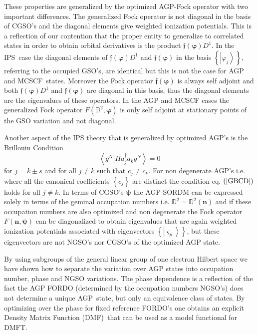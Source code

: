 \documentclass[aps,preprint]{revtex4}%
\begin{document}
These properties are generalized by the optimized AGP-Fock operator with two
important differences. The generalized Fock operator is not diagonal in the
basis of CGSO's and the diagonal elements give weighted ionization potentials.
This is a reflection of our contention that the proper entity to generalize to
correlated states in order to obtain orbital derivatives is the product
$\mathfrak{f}\left(  \mathbf{\varphi}\right)  D^{1}$. In the IPS\ case the
diagonal elements of $\mathfrak{f}\left(  \mathbf{\varphi}\right)  D^{1}$ and
$\mathfrak{f}\left(  \mathbf{\varphi}\right)  $ in the basis $\left\{
\left\vert \varphi_{j}\right\rangle \right\}  $, referring to the occupied
GSO's, are identical but this is not the case for AGP and MCSCF\ states.
Moreover the Fock operator $\mathfrak{f}\left(  \mathbf{\varphi}\right)  $ is
always self adjoint and both $\mathfrak{f}\left(  \mathbf{\varphi}\right)
D^{1}$ and $\mathfrak{f}\left(  \mathbf{\varphi}\right)  $ are diagonal in
this basis, thus the diagonal elements are the eigenvalues of these operators.
In the AGP and MCSCF cases the generalized Fock operator $F\left(
\mathbb{D}^{2},\mathbf{\varphi}\right)  $ is only self adjoint at stationary
points of the GSO variation and not diagonal.

Another aspect of the IPS theory that is generalized by optimized AGP's is the
Brillouin Condition
\begin{equation}
\left\langle \left.  g^{N}\right\vert Ha_{j}^{\dagger}a_{k}g^{N}\right\rangle
=0 \label{GBCD}%
\end{equation}
for $j=k\pm s$ and for all $j\neq k$ such that $c_{j}\neq c_{k}$. For non
degenerate AGP's i.e. where all the canonical coefficients $\left\{
c_{j}\right\}  $ are distinct the condition eq. $\left(  \ref{GBCD}\right)  $
holds for all $j\neq k$. In terms of CGSO's $\mathbf{\psi}$ the AGP-SORDM can
be expressed solely in terms of the geminal occupation numbers i.e.
$\mathbb{D}^{2}=\mathbb{D}^{2}\left(  \mathbf{n}\right)  $ and if these
occupation numbers are also optimized and non degenerate the Fock operator
$F\left(  \mathbf{n},\mathbf{\psi}\right)  $ can be diagonalized to obtain
eigenvalues that are again weighted ionization potentials associated with
eigenvectors $\left\{  \left\vert \varsigma_{p}\right\rangle \right\}  $, but
these eigenvectors are not NGSO's nor CGSO's of the optimized AGP state.

By using subgroups of the general linear group of one electron Hilbert space
we have shown how to separate the variation over AGP states into occupation
number, phase and NGSO variations. The phase dependence is a reflection of the
fact the AGP FORDO (determined by the occupation numbers NGSO's) does not
determine a unique AGP\ state, but only an equivalence class of states. By
optimizing over the phase for fixed reference FORDO's one obtains an explicit
Density Matrix Function (DMF)\ that can be used as a model functional for DMFT.
\end{document}
